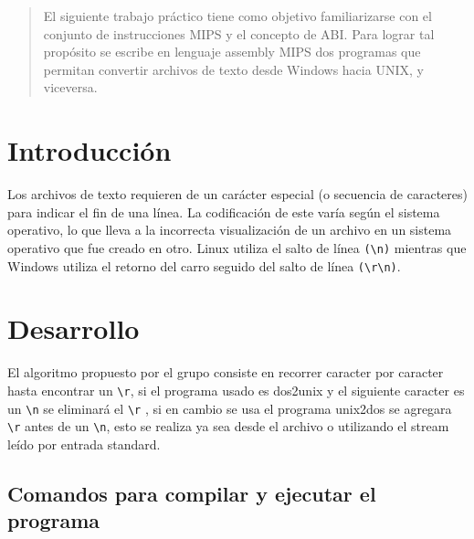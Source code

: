 \documentclass[a4paper]{article}
\begin{document}

\fecha{\today}



\maketitle

\renewcommand{\abstractname}{Resumen} 
\begin{abstract}
El siguiente trabajo práctico tiene como objetivo familiarizarse con el conjunto de instrucciones MIPS y el concepto de ABI. Para lograr tal propósito se escribe en lenguaje assembly MIPS dos programas que permitan convertir archivos de texto desde Windows hacia UNIX, y viceversa.
\end{abstract}


\section{Introducción}
Los archivos de texto requieren de un carácter especial (o secuencia de caracteres) para indicar el fin de una línea. La codificación de este varía según el sistema operativo, lo que lleva a la incorrecta visualización de un archivo en un sistema operativo que fue creado en otro. Linux utiliza el salto de línea \verb|(\n)| mientras que Windows utiliza el retorno del carro seguido del salto de línea \verb|(\r\n)|.

\section{Desarrollo}

El algoritmo propuesto por el grupo consiste en recorrer caracter por caracter hasta encontrar un \verb|\r|, si el programa usado es dos2unix y el siguiente caracter es un \verb|\n| se eliminará el \verb|\r| , si en cambio se usa el programa unix2dos se agregara \verb|\r| antes de un \verb|\n|, esto se realiza ya sea desde el archivo o utilizando el stream leído por entrada standard.


\subsection{Comandos para compilar y ejecutar el programa}
\end{document}
